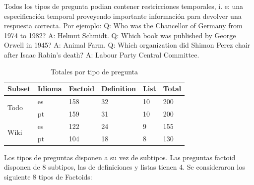 Todos los tipos de pregunta podian contener restricciones temporales, i. e: una especificación temporal proveyendo importante información para devolver una respuesta correcta. Por ejemplo: \newline
Q: Who was the Chancellor of Germany from 1974 to 1982? \newline
A: Helmut Schmidt.\newline
Q: Which book was published by George Orwell in 1945?\newline
A: Animal Farm.\newline
Q: Which organization did Shimon Perez chair after Isaac Rabin’s death?\newline
A: Labour Party Central Committee.\newline


\begin{center}
\begin{table}
\begin{tabular}{| l | l | l | l | l | l |}
\hline
Subset & Idioma & Factoid & Definition & List & Total \\ \hline
\multirow{2}{*}{Todo} & es & 158 & 32 & 10 & 200 \\ \cline{2-6}
 & pt & 159 & 31 & 10 & 200 \\ \hline
 \multirow{2}{*}{Wiki} & es & 122 & 24 & 9 & 155 \\ \cline{2-6}
 & pt & 104 & 18 & 8 & 130 \\ \hline
\end{tabular}
\caption{Totales por tipo de pregunta}
\label{table:totals-type-question}
\end{table}
\end{center}

Los tipos de preguntas disponen a su vez de subtipos. Las preguntas factoid disponen de 8 subtipos, las de definiciones y listas tienen 4.
Se consideraron los siguiente 8 tipos de Factoids: 

